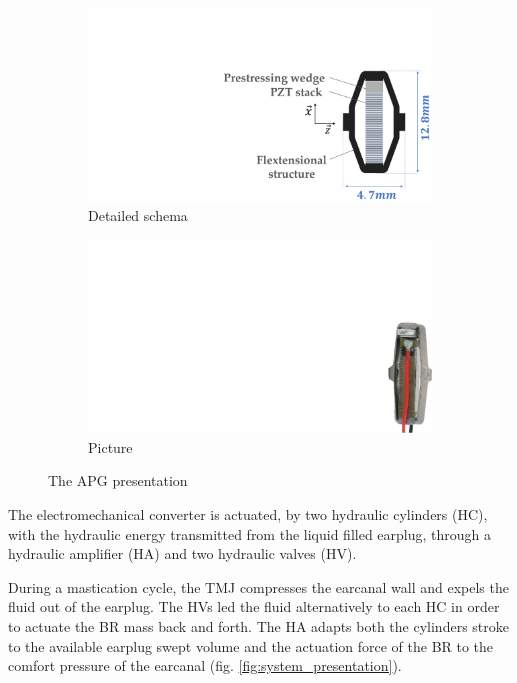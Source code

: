\documentclass[3p,twocolumn,preprint]{elsarticle}
\def \hfillx {\hspace*{ -\linewidth} \hfill} %
\begin{document}
\begin{figure}[!htb]
	\begin{center}
		\begin{subfigure}[t]{0.5\linewidth}
			\captionsetup{justification=centering}
			\includegraphics[trim={13cm 0cm 0cm 6cm},clip,width=\linewidth]{figures/APG_schema.pdf}
			\caption{Detailed schema}
			\label{fig:APG_schema}
		\end{subfigure}
		\hfillx
		\begin{subfigure}[t]{0.21\linewidth}
			\captionsetup{justification=centering}
			\includegraphics[trim={29.5cm 0cm 0cm 8cm},clip,width=0.65\linewidth]{figures/APG_photo.pdf}
			\caption{Picture}
			\label{fig:APG_photo}
		\end{subfigure}
		\caption{The APG presentation}
		\label{fig:APG}
	\end{center}
\end{figure}

The electromechanical converter is actuated, by two hydraulic cylinders (HC), with the hydraulic energy transmitted from the liquid filled earplug, through a hydraulic amplifier (HA) and two hydraulic valves (HV).

During a mastication cycle, the TMJ compresses the earcanal wall and expels the fluid out of the earplug. The HVs led the fluid alternatively to each HC in order to actuate the BR mass back and forth. The HA adapts both the cylinders stroke to the available earplug swept volume and the actuation force of the BR to the comfort pressure of the earcanal (fig. \ref{fig:system_presentation}).
\end{document}
